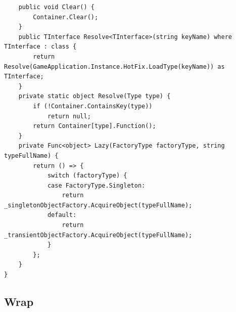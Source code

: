\documentclass[9pt, b5paper]{article}
\begin{document}
\begin{verbatim}
    public void Clear() {
        Container.Clear();
    }
    public TInterface Resolve<TInterface>(string keyName) where TInterface : class {
        return Resolve(GameApplication.Instance.HotFix.LoadType(keyName)) as TInterface;
    }
    private static object Resolve(Type type) {
        if (!Container.ContainsKey(type)) 
            return null;
        return Container[type].Function();
    }
    private Func<object> Lazy(FactoryType factoryType, string typeFullName) {
        return () => {
            switch (factoryType) {
            case FactoryType.Singleton:
                return _singletonObjectFactory.AcquireObject(typeFullName);
            default:
                return _transientObjectFactory.AcquireObject(typeFullName);
            }
        };
    }
}
\end{verbatim}
\subsection{Wrap}
\label{sec-5-4}
\end{document}
